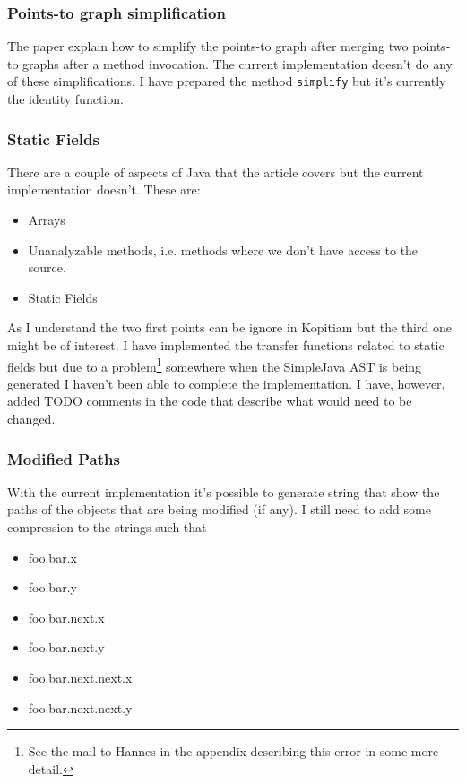 \documentclass[11pt]{exam}
\begin{document}
\subsubsection*{Points-to graph simplification}

The paper explain how to simplify the points-to graph after merging
two points-to graphs after a method invocation. The current
implementation doesn't do any of these simplifications. I have
prepared the method \texttt{simplify} but it's currently the identity
function.

\subsubsection*{Static Fields}

There are a couple of aspects of Java that the article covers but the
current implementation doesn't. These are:

\begin{itemize}
  \setlength{\itemsep}{1pt}
  \setlength{\parskip}{0pt}
  \item Arrays
  \item Unanalyzable methods, i.e. methods where we don't have access to the source.
  \item Static Fields
\end{itemize}

As I understand the two first points can be ignore in Kopitiam but the
third one might be of interest. I have implemented the transfer
functions related to static fields but due to a problem\footnote{See
the mail to Hannes in the appendix describing this error in some more
detail.} somewhere when the SimpleJava AST is being generated I
haven't been able to complete the implementation. I have, however,
added TODO comments in the code that describe what would need to be
changed.

\subsubsection*{Modified Paths}
\label{subsub:mp}

With the current implementation it's possible to generate string that
show the paths of the objects that are being modified (if any). I
still need to add some compression to the strings such that

\begin{itemize}
  \setlength{\itemsep}{1pt}
  \setlength{\parskip}{0pt}
  \item foo.bar.x
  \item foo.bar.y
  \item foo.bar.next.x
  \item foo.bar.next.y
  \item foo.bar.next.next.x
  \item foo.bar.next.next.y
\end{itemize}
\end{document}
